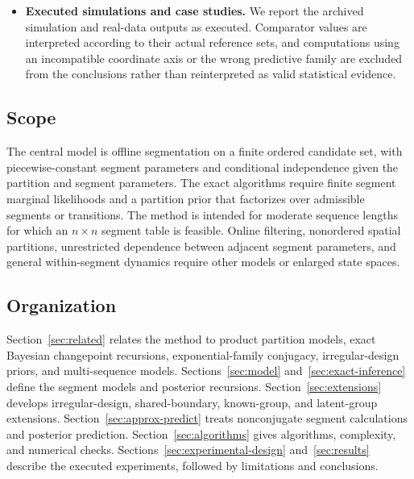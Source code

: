 \begin{itemize}
  \item \RealResultTag\enspace \textbf{Executed simulations and case studies.} We report the archived simulation and real-data outputs as executed. Comparator values are interpreted according to their actual reference sets, and computations using an incompatible coordinate axis or the wrong predictive family are excluded from the conclusions rather than reinterpreted as valid statistical evidence.
\end{itemize}

\subsection{Scope}
The central model is offline segmentation on a finite ordered candidate set, with piecewise-constant segment parameters and conditional independence given the partition and segment parameters. The exact algorithms require finite segment marginal likelihoods and a partition prior that factorizes over admissible segments or transitions. The method is intended for moderate sequence lengths for which an $n\times n$ segment table is feasible. Online filtering, nonordered spatial partitions, unrestricted dependence between adjacent segment parameters, and general within-segment dynamics require other models or enlarged state spaces.

\subsection{Organization}
Section~\ref{sec:related} relates the method to product partition models, exact Bayesian changepoint recursions, exponential-family conjugacy, irregular-design priors, and multi-sequence models. Sections~\ref{sec:model} and~\ref{sec:exact-inference} define the segment models and posterior recursions. Section~\ref{sec:extensions} develops irregular-design, shared-boundary, known-group, and latent-group extensions. Section~\ref{sec:approx-predict} treats nonconjugate segment calculations and posterior prediction. Section~\ref{sec:algorithms} gives algorithms, complexity, and numerical checks. Sections~\ref{sec:experimental-design} and~\ref{sec:results} describe the executed experiments, followed by limitations and conclusions.

